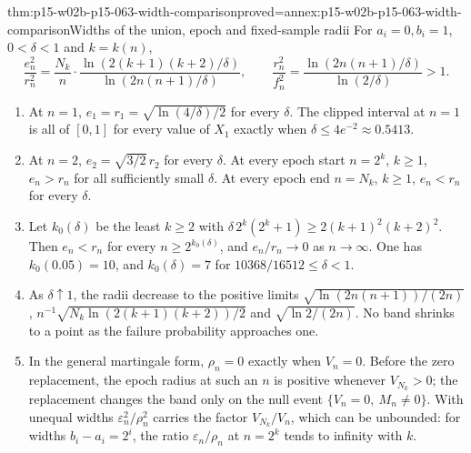 \begin{hbtheorem}{thm:p15-w02b-p15-063-width-comparison}{proved=annex:p15-w02b-p15-063-width-comparison}{Widths of the union, epoch and fixed-sample radii}
For \(a_i=0,b_i=1\), \(0<\delta<1\) and \(k=k(n)\),
\[
 \frac{e_n^2}{r_n^2}
  =\frac{N_k}n\cdot\frac{\ln(2(k+1)(k+2)/\delta)}{\ln(2n(n+1)/\delta)},
 \qquad
 \frac{r_n^2}{f_n^2}=\frac{\ln(2n(n+1)/\delta)}{\ln(2/\delta)}>1 .
\]
\begin{enumerate}
\item At \(n=1\), \(e_1=r_1=\sqrt{\ln(4/\delta)/2}\) for every \(\delta\).
 The clipped interval at \(n=1\) is all of \([0,1]\) for every value
 of \(X_1\) exactly when
 \(\delta\leq4e^{-2}\approx0.5413\).
\item At \(n=2\), \(e_2=\sqrt{3/2}\,r_2\) for every \(\delta\). At every
 epoch start \(n=2^k\), \(k\geq1\), \(e_n>r_n\) for all sufficiently
 small \(\delta\). At every epoch end \(n=N_k\), \(k\geq1\), \(e_n<r_n\) for every \(\delta\).
\item Let \(k_0(\delta)\) be the least \(k\geq2\) with
 \(\delta\,2^k(2^k+1)\geq2(k+1)^2(k+2)^2\). Then \(e_n<r_n\) for every
 \(n\geq2^{k_0(\delta)}\), and \(e_n/r_n\to0\) as \(n\to\infty\).
 One has \(k_0(0.05)=10\), and \(k_0(\delta)=7\) for
 \(10368/16512\leq\delta<1\).
\item As \(\delta\uparrow1\), the radii decrease to the positive limits
 \(\sqrt{\ln(2n(n+1))/(2n)}\),
 \(n^{-1}\sqrt{N_k\ln(2(k+1)(k+2))/2}\) and \(\sqrt{\ln2/(2n)}\).
 No band shrinks to a point as the failure probability approaches one.
\item In the general martingale form, \(\rho_n=0\) exactly when
 \(V_n=0\). Before the zero replacement, the epoch radius at such an
 \(n\) is positive whenever \(V_{N_k}>0\); the replacement changes the
 band only on the null event \(\{V_n=0,\ M_n\ne0\}\). With unequal widths
 \(\varepsilon_n^2/\rho_n^2\) carries the factor \(V_{N_k}/V_n\), which
 can be unbounded: for widths \(b_i-a_i=2^i\), the ratio
 \(\varepsilon_n/\rho_n\) at \(n=2^k\) tends to infinity with \(k\).
\end{enumerate}
\end{hbtheorem}

